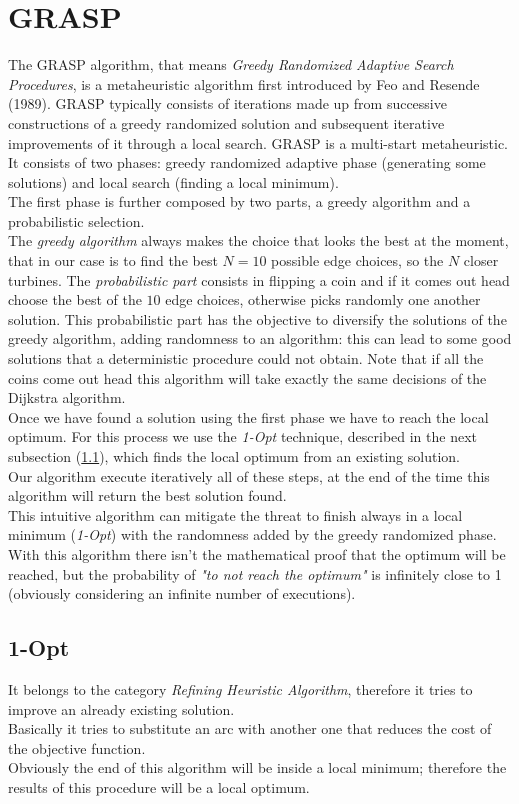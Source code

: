 \section{GRASP}
The GRASP algorithm, that means \textit{Greedy Randomized Adaptive Search Procedures}, is a metaheuristic algorithm first introduced by Feo and Resende (1989). GRASP typically consists of iterations made up from successive constructions of a greedy randomized solution and subsequent iterative improvements of it through a local search. GRASP is a multi-start metaheuristic. \\
It consists of two phases: greedy randomized adaptive phase (generating some solutions) and local search (finding a local minimum).\\
The first phase is further composed by two parts, a greedy algorithm and a probabilistic selection.\\
The \textit{greedy algorithm} always makes the choice that looks the best at the moment, that in our case is to find the best $N = 10$ possible edge choices, so the $N$ closer turbines. The \textit{probabilistic part} consists in flipping a coin and if it comes out head choose the best of the $10$ edge choices, otherwise picks randomly one another solution. This probabilistic part has the objective to diversify the solutions of the greedy algorithm, adding randomness to an algorithm: this can lead to some good solutions that a deterministic procedure could not obtain. Note that if all the coins come out head this algorithm will take exactly the same decisions of the Dijkstra algorithm.\\
Once we have found a solution using the first phase we have to reach the local optimum. For this process we use the \textit{1-Opt} technique, described in the next subsection (\ref{subsec:1opt}), which finds the local optimum from an existing solution.\\
Our algorithm execute iteratively all of these steps, at the end of the time this algorithm will return the best solution found. \\
This intuitive algorithm can mitigate the threat to finish always in a local minimum (\textit{1-Opt}) with the randomness added by the greedy randomized phase.\\ 
With this algorithm there isn't the mathematical proof that the optimum will be reached, but the probability of \textit{"to not reach the optimum"} is infinitely close to 1 (obviously considering an infinite number of executions). 
\subsection{1-Opt} \label{subsec:1opt}
It belongs to the category \textit{Refining Heuristic Algorithm}, therefore it tries to improve an already existing solution.\\                                                         
Basically it tries to substitute an arc with another one that reduces the cost of the objective function. \\
Obviously the end of this algorithm will be inside a local minimum; therefore the results of this procedure will be a local optimum. 

